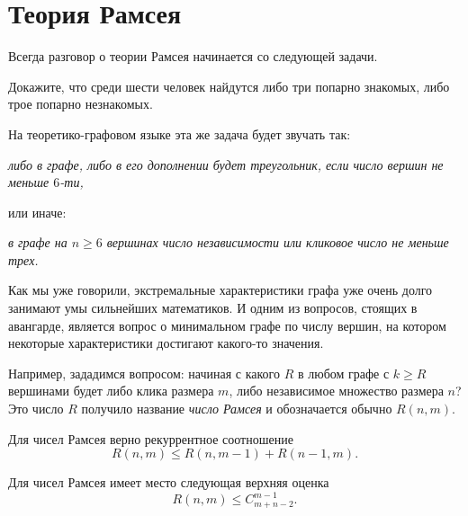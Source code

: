 \section{Теория Рамсея}


	Всегда разговор о теории Рамсея начинается со следующей задачи.
\begin{statement} 
	Докажите, что среди шести человек найдутся либо три попарно знакомых, либо трое попарно незнакомых.
\end{statement}

	На теоретико-графовом языке эта же задача будет звучать так:
	
	\emph{либо в графе, либо в его дополнении будет треугольник, если число вершин не меньше $6$-ти,}
	
	или иначе:
	
	\emph{в графе на $n \geqslant 6$ вершинах число независимости или кликовое число не меньше трех.}

	Как мы уже говорили, экстремальные характеристики графа уже очень долго занимают умы сильнейших математиков. И одним из вопросов, стоящих в авангарде, является вопрос о минимальном графе по числу вершин, на котором некоторые характеристики достигают какого-то значения.
	
	Например, зададимся вопросом: начиная с какого $R$ в любом графе с $k \geqslant R$ вершинами будет либо клика размера $m$, либо независимое множество размера $n$? Это число $R$ получило название \emph{число Рамсея} и обозначается обычно $R(n, m)$. 

\begin{statement}
	Для чисел Рамсея верно рекуррентное соотношение
	$$R(n, m) \leqslant R(n, m-1) + R(n-1, m).$$
\end{statement}

\begin{consequence}
	Для чисел Рамсея имеет место следующая верхняя оценка
	$$R(n ,m) \leqslant C_{m+n-2}^{m-1}.$$
\end{consequence}



